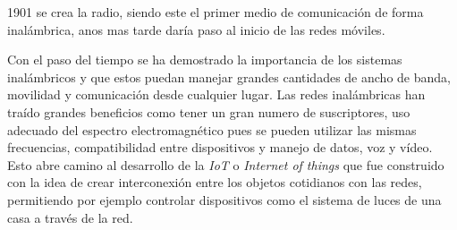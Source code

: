 \documentclass[10pt,journal,compsoc]{IEEEtran}
\begin{document}




% 
% 
% 
% 
 1901 se crea la radio, siendo este el primer medio de comunicación de forma inalámbrica, anos mas tarde daría paso al  inicio de las redes móviles. 

Con el paso del tiempo se ha demostrado la importancia de los sistemas inalámbricos y que estos puedan manejar grandes cantidades de ancho de banda, movilidad y comunicación desde cualquier lugar. 
Las redes inalámbricas han traído grandes beneficios como tener un gran numero de suscriptores, uso adecuado del espectro electromagnético pues se pueden utilizar las mismas frecuencias, compatibilidad entre dispositivos y manejo de datos, voz y vídeo. Esto abre camino al desarrollo de la \emph{IoT} o \emph{Internet of things} que fue construido con la idea de crear interconexión entre los objetos cotidianos con las redes, permitiendo por ejemplo controlar dispositivos como el sistema de luces de una casa a través de la red. 
\end{document}
